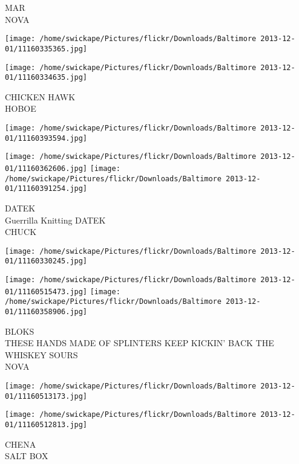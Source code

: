 \documentclass[10pt,letterpaper]{article}
\begin{document}
MAR\\
NOVA\\
\pagebreak

\texttt{[image: /home/swickape/Pictures/flickr/Downloads/Baltimore 2013-12-01/11160335365.jpg]}

\vspace{0.25in}
\texttt{[image: /home/swickape/Pictures/flickr/Downloads/Baltimore 2013-12-01/11160334635.jpg]}

CHICKEN HAWK\\
HOBOE\\
\pagebreak

\texttt{[image: /home/swickape/Pictures/flickr/Downloads/Baltimore 2013-12-01/11160393594.jpg]}

\vspace{0.25in}
\texttt{[image: /home/swickape/Pictures/flickr/Downloads/Baltimore 2013-12-01/11160362606.jpg]}
\texttt{[image: /home/swickape/Pictures/flickr/Downloads/Baltimore 2013-12-01/11160391254.jpg]}

DATEK\\
Guerrilla Knitting DATEK\\
CHUCK\\
\pagebreak

\texttt{[image: /home/swickape/Pictures/flickr/Downloads/Baltimore 2013-12-01/11160330245.jpg]}

\vspace{0.25in}
\texttt{[image: /home/swickape/Pictures/flickr/Downloads/Baltimore 2013-12-01/11160515473.jpg]}
\texttt{[image: /home/swickape/Pictures/flickr/Downloads/Baltimore 2013-12-01/11160358906.jpg]}

BLOKS\\
THESE HANDS MADE OF SPLINTERS KEEP KICKIN' BACK THE WHISKEY SOURS\\
NOVA\\
\pagebreak

\texttt{[image: /home/swickape/Pictures/flickr/Downloads/Baltimore 2013-12-01/11160513173.jpg]}

\vspace{0.25in}
\texttt{[image: /home/swickape/Pictures/flickr/Downloads/Baltimore 2013-12-01/11160512813.jpg]}

CHENA\\
SALT BOX\\
\pagebreak
\end{document}
